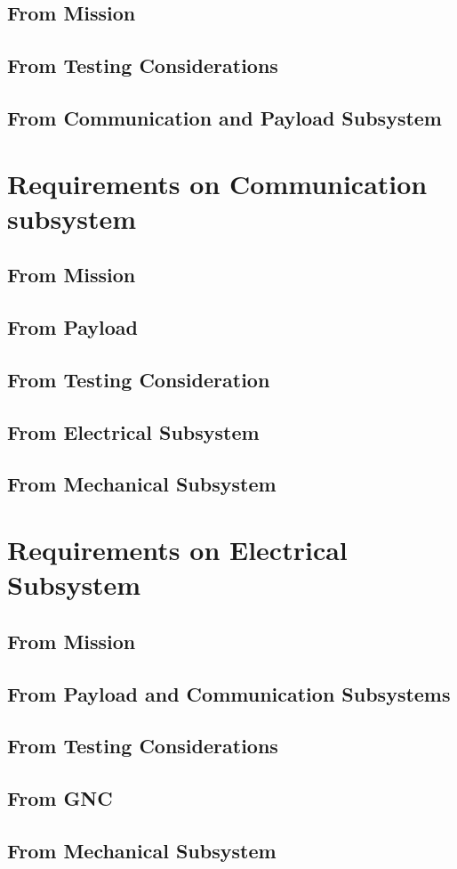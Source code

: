 \subsection{From Mission}
\subsection{From Testing Considerations}
\subsection{From Communication and Payload \mbox{Subsystem} }


\newpage
\section{Requirements on Communication subsystem}
\subsection{From Mission}
\subsection{From Payload}
\subsection{From Testing Consideration}
\subsection{From Electrical Subsystem}
\subsection{From Mechanical Subsystem}


\newpage
\section{Requirements on Electrical Subsystem}
\subsection{From Mission}
\subsection{From Payload and Communication Subsystems}
\subsection{From Testing Considerations}
\subsection{From GNC}
\subsection{From Mechanical Subsystem}


